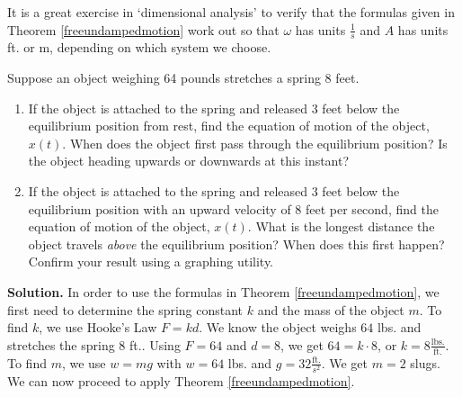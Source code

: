 \medskip

It is a great exercise in `dimensional analysis' to verify that the formulas given in Theorem \ref{freeundampedmotion} work out so that $\omega$ has units $\frac{1}{s}$ and  $A$ has units ft. or m, depending on which system we choose.

\begin{ex} \label{freeudampedex}  Suppose an object weighing  64 pounds stretches a spring 8 feet.  

\begin{enumerate}

\item  If the object is attached to the spring and released 3 feet below the equilibrium position from rest, find the equation of motion of the object, $x(t)$.  When does the object first pass through the equilibrium position?  Is the object heading upwards or downwards at this instant? 

\item  If the object is attached to the spring and released 3 feet below the equilibrium position with an upward velocity of $8$ feet  per second, find the equation of motion of the object, $x(t)$.  What is the longest distance the object travels \textit{above} the equilibrium position?  When does this first happen? Confirm your result using a graphing utility.

\end{enumerate}

{\bf Solution.} In order to use the formulas in Theorem \ref{freeundampedmotion}, we first need to determine the spring constant $k$ and the mass of the object $m$.  To find $k$, we use Hooke's Law $F = kd$.  We know the object weighs $64$ lbs. and stretches the spring $8$ ft.. Using $F = 64$ and $d = 8$,  we get  $64  = k \cdot 8 $, or  $k = 8 \frac{\text{lbs.}}{\text{ft.}}$.  To find $m$, we use $w = mg$ with $w = 64$ lbs. and $g =32 \frac{\text{ft.}}{s^2}$.  We get $m = 2$ slugs.  We can now proceed to apply Theorem \ref{freeundampedmotion}.

\begin{enumerate}


\end{enumerate}
\end{ex}
